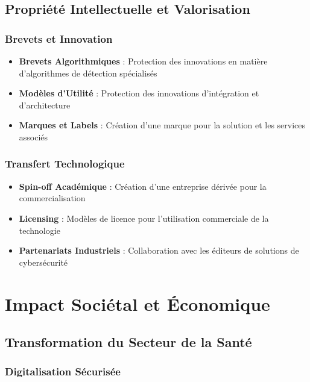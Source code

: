 \subsection{Propriété Intellectuelle et Valorisation}

\subsubsection{Brevets et Innovation}

\begin{itemize}
    \item \textbf{Brevets Algorithmiques} : Protection des innovations en matière d'algorithmes de détection spécialisés
    \item \textbf{Modèles d'Utilité} : Protection des innovations d'intégration et d'architecture
    \item \textbf{Marques et Labels} : Création d'une marque pour la solution et les services associés
\end{itemize}

\subsubsection{Transfert Technologique}

\begin{itemize}
    \item \textbf{Spin-off Académique} : Création d'une entreprise dérivée pour la commercialisation
    \item \textbf{Licensing} : Modèles de licence pour l'utilisation commerciale de la technologie
    \item \textbf{Partenariats Industriels} : Collaboration avec les éditeurs de solutions de cybersécurité
\end{itemize}

\section{Impact Sociétal et Économique}

\subsection{Transformation du Secteur de la Santé}

\subsubsection{Digitalisation Sécurisée}

